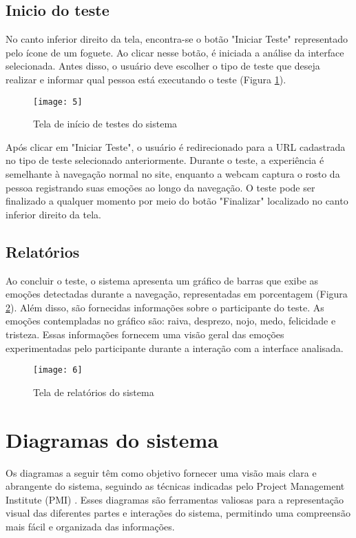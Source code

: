 \clearpage
\subsection{Inicio do teste}

No canto inferior direito da tela, encontra-se o botão "Iniciar Teste" representado pelo ícone de um foguete. Ao clicar nesse botão, é iniciada a análise da interface selecionada. Antes disso, o usuário deve escolher o tipo de teste que deseja realizar e informar qual pessoa está executando o teste (Figura \ref{fig:5}).

\begin{figure}[h]
  \caption{Tela de início de testes do sistema}
  \centering
  \texttt{[image: 5]}
  \label{fig:5}
\end{figure}
\FloatBarrier

Após clicar em "Iniciar Teste", o usuário é redirecionado para a URL cadastrada no tipo de teste selecionado anteriormente. Durante o teste, a experiência é semelhante à navegação normal no site, enquanto a webcam captura o rosto da pessoa registrando suas emoções ao longo da navegação. O teste pode ser finalizado a qualquer momento por meio do botão "Finalizar" localizado no canto inferior direito da tela.

\subsection{Relatórios}

Ao concluir o teste, o sistema apresenta um gráfico de barras que exibe as emoções detectadas durante a navegação, representadas em porcentagem (Figura \ref{fig:6}). Além disso, são fornecidas informações sobre o participante do teste. As emoções contempladas no gráfico são: raiva, desprezo, nojo, medo, felicidade e tristeza. Essas informações fornecem uma visão geral das emoções experimentadas pelo participante durante a interação com a interface analisada.

\begin{figure}[h]
  \caption{Tela de relatórios do sistema}
  \centering
  \texttt{[image: 6]}
  \label{fig:6}
\end{figure}
\FloatBarrier

\section{Diagramas do sistema}

Os diagramas a seguir têm como objetivo fornecer uma visão mais clara e abrangente do sistema, seguindo as técnicas indicadas pelo Project Management Institute (PMI) \cite{31}. Esses diagramas são ferramentas valiosas para a representação visual das diferentes partes e interações do sistema, permitindo uma compreensão mais fácil e organizada das informações.

